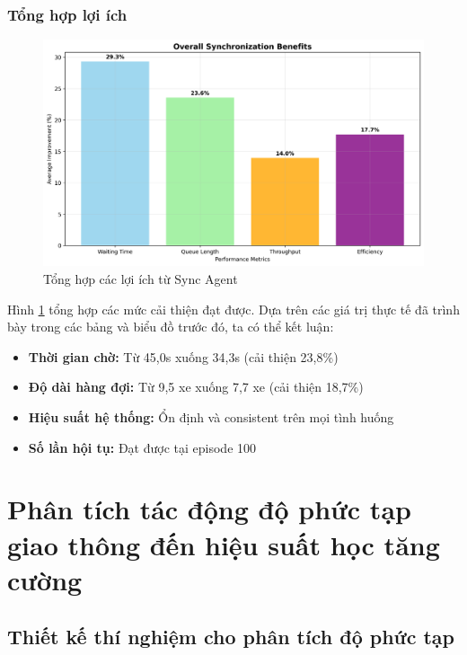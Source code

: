 \subsubsection{Tổng hợp lợi ích}

\begin{figure}[!htp]
    \centering
    \includegraphics[width=\textwidth]{figures/overall_benefits.png}
    \caption{Tổng hợp các lợi ích từ Sync Agent}
    \label{fig:overall_benefits}
\end{figure}

Hình \ref{fig:overall_benefits} tổng hợp các mức cải thiện đạt được. 
Dựa trên các giá trị thực tế đã trình bày trong các bảng và biểu đồ trước đó, 
ta có thể kết luận:
\begin{itemize}
    \item \textbf{Thời gian chờ:} Từ 45,0s xuống 34,3s (cải thiện 23,8\%)
    \item \textbf{Độ dài hàng đợi:} Từ 9,5 xe xuống 7,7 xe (cải thiện 18,7\%)
    \item \textbf{Hiệu suất hệ thống:} Ổn định và consistent trên mọi tình huống
    \item \textbf{Số lần hội tụ:} Đạt được tại episode 100
\end{itemize}

\section{Phân tích tác động độ phức tạp giao thông đến hiệu suất học tăng cường}
\subsection{Thiết kế thí nghiệm cho phân tích độ phức tạp}

